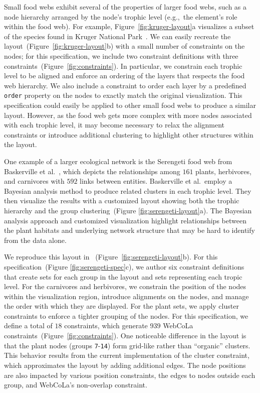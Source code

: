 Small food webs exhibit several of the properties of larger food webs, such
as a node hierarchy arranged by the node's trophic level (e.g.,~the element's 
role within the food web).
For example, Figure~\ref{fig:kruger-layout}a visualizes a subset of the
species found in Kruger National Park~\cite{kruger2017}. We can easily 
recreate the layout~(Figure~\ref{fig:kruger-layout}b) with a small 
number of constraints on the nodes; for this specification, we include 
two constraint definitions with three constraints~(Figure~\ref{fig:constraints}).
In particular, we constrain each trophic level to be aligned and enforce an
ordering of the layers that respects the food web hierarchy. We also
include a constraint to order each layer by a predefined \texttt{order} property
on the nodes to exactly match the original visualization. This \projectname specification 
could easily be applied to other small food webs to produce a similar layout.
However, as the food web gets more complex with more nodes associated with
each trophic level, it may become necessary to relax the alignment
constraints or introduce additional clustering to highlight other
structures within the layout.

One example of a larger ecological network is the Serengeti food web from
Baskerville et al.~\cite{baskerville2011spatial,baskerville2011interactive}, which depicts the
relationships among $161$ plants, herbivores, and carnivores with $592$ links
between entities. Baskerville et al.\ employ a Bayesian analysis method to
produce related clusters in each trophic level. They then visualize the results with a
customized layout showing both the trophic hierarchy and
the group clustering~(Figure \ref{fig:serengeti-layout}a). The Bayesian
analysis approach and customized visualization highlight relationships between
the plant habitats and underlying network structure that may be hard to identify
from the data alone.

We reproduce this layout in \projectname~(Figure~\ref{fig:serengeti-layout}b).
For this specification~(Figure \ref{fig:serengeti-spec}c), we author six constraint 
definitions that create sets for each group in the layout and sets 
representing each tropic level. For the carnivores and herbivores,
we constrain the position of the nodes within the visualization region,
introduce alignments on the nodes, and manage the order with which they
are displayed. For the plant sets, we apply cluster constraints
to enforce a tighter grouping of the nodes. For this specification,
we define a total of $18$ \projectname constraints, which generate $939$
WebCoLa constraints~(Figure~\ref{fig:constraints}). One noticeable difference
in the \projectname layout is that the plant nodes (groups \texttt{7}-\texttt{14}) 
form grid-like rather than ``organic'' clusters. This behavior
results from the current implementation of the cluster constraint,
which approximates the layout by adding additional edges. The node
positions are also impacted by various position constraints, the edges to 
nodes outside each group, and WebCoLa's non-overlap constraint.

